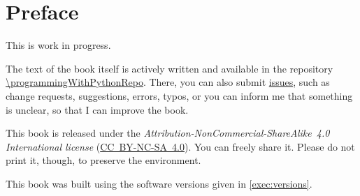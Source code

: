 \chapter*{Preface}%
%
%
This is work in progress.

The text of the book itself is actively written and available in the repository \url{\programmingWithPythonRepo}.
There, you can also submit \href{\programmingWithPythonRepo/issues}{issues}, such as change requests, suggestions, errors, typos, or you can inform me that something is unclear, so that I can improve the book.

This book is released under the \emph{Attribution-NonCommercial-ShareAlike~4.0 International license} (\href{http://creativecommons.org/licenses/by-nc-sa/4.0/}{\mbox{CC~BY-NC-SA~4.0}}).
You can freely share it.
Please do not print it, though, to preserve the environment.

This book was built using the software versions given in \cref{exec:versions}.

